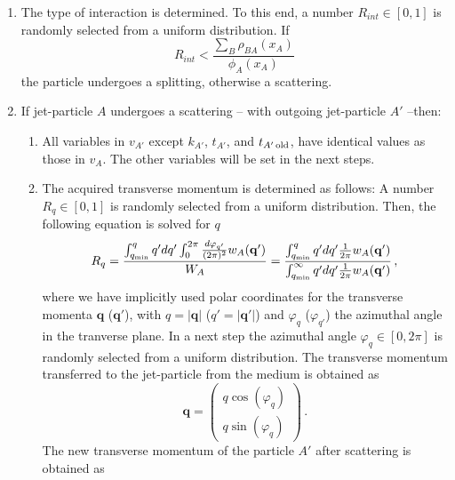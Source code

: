 \documentclass[preprint,12pt]{elsarticle}
\begin{document}
\begin{enumerate}
    \item The type of interaction is determined. To this end, a number 
    $R_{int}\in [0,1]$ is randomly selected from a uniform distribution.
    If 
    \begin{equation}
           R_{int}<\frac{\sum_B\rho_{BA}(x_A)}{\phi_A(x_A)}
           \label{eq:spvssc}
    \end{equation}
    the particle undergoes a splitting, otherwise a scattering.
    \item  If jet-particle $A$ undergoes a scattering -- with outgoing jet-particle $A'$ --then:
    \begin{enumerate}
        \item All variables in $v_{A'}$ except $k_{A'}$, $t_{A'}$, and $t_{A'\,{\rm old}}$, have identical values as those in $v_A$.
            The other variables will be set in the next steps.
        \item The acquired transverse momentum is determined as follows:
            A number $R_{q}\in [0,1]$ is randomly selected from a uniform distribution. 
            Then, the following equation is solved for $q$
            \begin{equation}
                R_{q}=\frac{\int_{q_{\rm min}}^q q'dq'\int_0^{2\pi}\frac{d\varphi_{q'}}{(2\pi)^2} w_A(\mathbf{q}') }{W_A}=\frac{\int_{q_{\rm min}}^q q'dq'\frac{1}{2\pi} w_A(\mathbf{q}') }{\int_{q_{\rm min}}^\infty q'dq'\frac{1}{2\pi} w_A(\mathbf{q}')}\,,
                \label{eq:selq}
            \end{equation}
            where we have implicitly used polar coordinates for the transverse momenta $\mathbf{q}$ ($\mathbf{q}'$), with $q=|\mathbf{q}|$ ($q'=|\mathbf{q}'|$) and $\varphi_q$ ($\varphi_{q'}$) the azimuthal angle in the tranverse plane. 
            In a next step the azimuthal angle $\varphi_{q} \in [0,2\pi]$ is randomly selected from a uniform distribution.
            The transverse momentum transferred to the jet-particle from the medium is obtained as 
            \begin{equation}
            \mathbf{q}=\left(\begin{array}{c}
            q \cos(\varphi_q)  \\
            q \sin(\varphi_q) 
            \end{array}\right)\,.
            \end{equation}
            The new transverse momentum of the particle $A'$ after scattering is obtained as 

\end{enumerate}
\end{enumerate}
\end{document}
